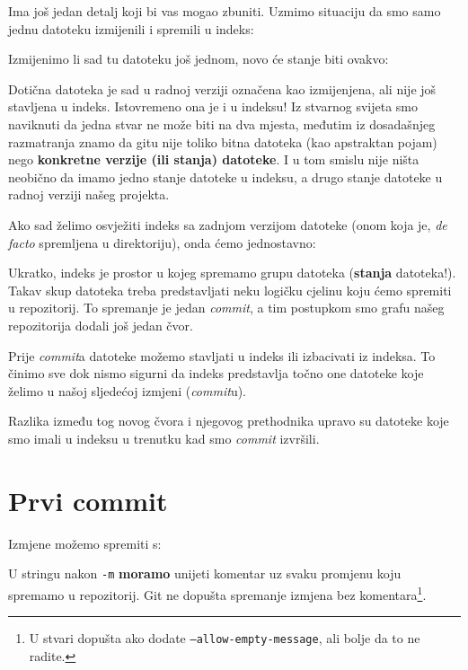 Ima još jedan detalj koji bi vas mogao zbuniti. 
Uzmimo situaciju da smo samo jednu datoteku izmijenili i spremili u indeks:



Izmijenimo li sad tu datoteku još jednom, novo će stanje biti ovakvo:



Dotična datoteka je sad u radnoj verziji označena kao izmijenjena, ali nije još stavljena u indeks.
Istovremeno ona je i u indeksu!
Iz stvarnog svijeta smo naviknuti da jedna stvar ne može biti na dva mjesta, međutim iz dosadašnjeg razmatranja znamo da gitu nije toliko bitna datoteka (kao apstraktan pojam) nego \textbf{konkretne verzije (ili stanja) datoteke}.
I u tom smislu nije ništa neobično da imamo jedno stanje datoteke u indeksu, a drugo stanje datoteke u radnoj verziji našeg projekta.

Ako sad želimo osvježiti indeks sa zadnjom verzijom datoteke (onom koja je, \emph{de facto} spremljena u direktoriju), onda ćemo jednostavno:


Ukratko, indeks je prostor u kojeg spremamo grupu datoteka (\textbf{stanja} datoteka!).
Takav skup datoteka treba predstavljati neku logičku cjelinu koju ćemo spremiti u repozitorij.
To spremanje je jedan \emph{commit}, a tim postupkom smo grafu našeg repozitorija dodali još jedan čvor. 

Prije \emph{commit}a datoteke možemo stavljati u indeks ili izbacivati iz indeksa.
To činimo sve dok nismo sigurni da indeks predstavlja točno one datoteke koje želimo u našoj sljedećoj izmjeni (\emph{commit}u).

Razlika između tog novog čvora i njegovog prethodnika upravo su datoteke koje smo imali u indeksu u trenutku kad smo \emph{commit} izvršili.

\section*{Prvi commit}

Izmjene možemo spremiti s:


U stringu nakon \verb+-m+ \textbf{moramo} unijeti komentar uz svaku promjenu koju spremamo u repozitorij.
Git ne dopušta spremanje izmjena bez komentara\footnote{U stvari dopušta ako dodate \texttt{--allow-empty-message}, ali bolje da to ne radite.}.


